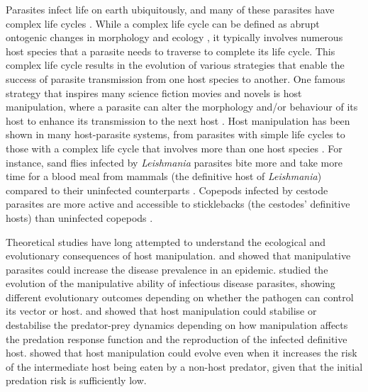 \documentclass[a4paper]{scrartcl}
\begin{document}
Parasites infect life on earth ubiquitously, and many of these parasites have complex life cycles \citep{zimmer:book:2001}. 
While a complex life cycle can be defined as abrupt ontogenic changes in morphology and ecology \citep{Benesh:2016dj}, it typically involves numerous host species that a parasite needs to traverse to complete its life cycle. 
This complex life cycle results in the evolution of various strategies that enable the success of parasite transmission from one host species to another. 
One famous strategy that inspires many science fiction movies and novels is host manipulation, where a parasite can alter the morphology and/or behaviour of its  host to enhance its transmission to the next host \citep{Hughes2012}. 
Host manipulation has been shown in many host-parasite systems, from parasites with simple life cycles to those with a complex life cycle that involves more than one host species \citep{Hughes2012,molyneux_jefferies1986}. 
For instance, sand flies infected by \textit{Leishmania} parasites bite more and take more time for a blood meal from mammals (the definitive host of \textit{Leishmania}) compared to their uninfected counterparts \citep{Rogers2007}. 
Copepods infected by cestode parasites are more active and accessible to sticklebacks (the cestodes' definitive hosts) than uninfected copepods \citep{Wedekind1996}.

Theoretical studies have long attempted to understand the ecological and evolutionary consequences of host manipulation. 
\cite{Roosien2013} and \cite{Hosack2008} showed that manipulative parasites could increase the disease prevalence in an epidemic. \cite{Gandon2018} studied the evolution of the manipulative ability of infectious disease parasites, showing different evolutionary outcomes depending on whether the pathogen can control its vector or host.
\cite{Hadeler1989, Fenton2006} and \cite{Rogawa2018} showed that host manipulation could stabilise or destabilise the predator-prey dynamics depending on how manipulation affects the predation response function and the reproduction of the infected definitive host. 
\cite{Seppl2008} showed that host manipulation could evolve even when it increases the risk of the intermediate host being eaten by a non-host predator, given that the initial predation risk is sufficiently low.  
\end{document}
